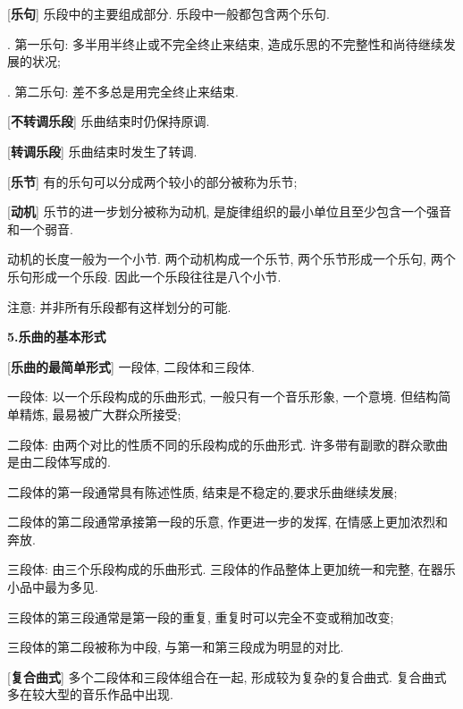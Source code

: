 [\textbf{乐句}] 乐段中的主要组成部分. 乐段中一般都包含两个乐句. \par
{}. 第一乐句: 多半用半终止或不完全终止来结束, 造成乐思的不完整性和尚待继续发展的状况;\par
{}. 第二乐句: 差不多总是用完全终止来结束.\par

[\textbf{不转调乐段}] 乐曲结束时仍保持原调.\par

[\textbf{转调乐段}] 乐曲结束时发生了转调.\par

[\textbf{乐节}] 有的乐句可以分成两个较小的部分被称为乐节; \par

[\textbf{动机}] 乐节的进一步划分被称为动机, 是旋律组织的最小单位且至少包含一个强音和一个弱音.\par
\qquad 动机的长度一般为一个小节. 两个动机构成一个乐节, 两个乐节形成一个乐句, 两个乐句形成一个乐段. 因此一个乐段往往是八个小节.\par
\qquad 注意: 并非所有乐段都有这样划分的可能.\par

\clearpage

\begin{center}
 \textbf{5.乐曲的基本形式}\\
\end{center}

[\textbf{乐曲的最简单形式}] 一段体, 二段体和三段体.\par
\qquad 一段体: 以一个乐段构成的乐曲形式, 一般只有一个音乐形象, 一个意境. 但结构简单精炼, 最易被广大群众所接受;\par
\qquad 二段体: 由两个对比的性质不同的乐段构成的乐曲形式. 许多带有副歌的群众歌曲是由二段体写成的.\par
\qquad \qquad 二段体的第一段通常具有陈述性质, 结束是不稳定的,要求乐曲继续发展;\par
\qquad \qquad 二段体的第二段通常承接第一段的乐意, 作更进一步的发挥, 在情感上更加浓烈和奔放. \par
\qquad 三段体: 由三个乐段构成的乐曲形式. 三段体的作品整体上更加统一和完整, 在器乐小品中最为多见.\par
\qquad \qquad 三段体的第三段通常是第一段的重复, 重复时可以完全不变或稍加改变;\par
\qquad \qquad 三段体的第二段被称为中段, 与第一和第三段成为明显的对比. \par

[\textbf{复合曲式}] 多个二段体和三段体组合在一起, 形成较为复杂的复合曲式. 复合曲式多在较大型的音乐作品中出现.\par



